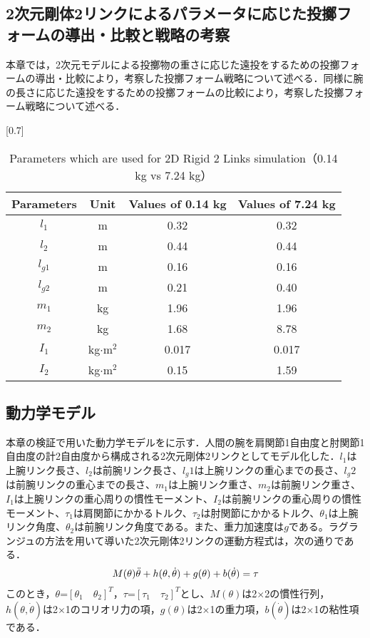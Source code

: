 \begin{small}
\section{2次元剛体2リンクによるパラメータに応じた投擲フォームの導出・比較と戦略の考察}
本章では，2次元モデルによる投擲物の重さに応じた遠投をするための投擲フォームの導出・比較により，考察した投擲フォーム戦略について述べる．同様に腕の長さに応じた遠投をするための投擲フォームの比較により，考察した投擲フォーム戦略について述べる．
\begin{table}[t]
  \begin{center}
    \caption{Parameters which are used for 2D Rigid 2 Links simulation（0.14 kg vs 7.24 kg）}
    \scalebox{0.7}[0.7]{
    \begin{tabular}{c|c|c|c}
      \hline
      Parameters & Unit & Values of 0.14 kg & Values of 7.24 kg \\
      \hline
      $l_{1}$ & m & 0.32 & 0.32\\
      $l_{2}$ & m & 0.44 & 0.44\\
      $l_{g1}$ & m & 0.16 & 0.16 \\
      $l_{g2}$ & m & 0.21 & 0.40 \\
      $m_{1}$ & kg & 1.96 & 1.96\\
      $m_{2}$ & kg & 1.68 & 8.78 \\
      $I_{1}$ & kg$\cdot$$\mathrm{m}^2$ & 0.017 & 0.017 \\
      $I_{2}$ & kg$\cdot$$\mathrm{m}^2$ & 0.15 & 1.59 \\
      \hline
    \end{tabular}
    }
  \end{center}
\end{table}
\subsection{動力学モデル}
本章の検証で用いた動力学モデルをに示す．人間の腕を肩関節1自由度と肘関節1自由度の計2自由度から構成される2次元剛体2リンクとしてモデル化した．$l_{1}$は上腕リンク長さ、$l_{2}$は前腕リンク長さ、$l_g{1}$は上腕リンクの重心までの長さ、$l_g{2}$は前腕リンクの重心までの長さ、$m_{1}$は上腕リンク重さ、$m_{2}$は前腕リンク重さ、$I_{1}$は上腕リンクの重心周りの慣性モーメント、$I_{2}$は前腕リンクの重心周りの慣性モーメント、$\tau_{1}$は肩関節にかかるトルク、$\tau_{2}$は肘関節にかかるトルク、$\theta_{1}$は上腕リンク角度、$\theta_{2}$は前腕リンク角度である。また、重力加速度は$g$である。ラグランジュの方法を用いて導いた2次元剛体2リンクの運動方程式は，次の通りである．
\begin{eqnarray}
  \equlabel{5}
  M(\theta)\ddot{\theta} + h(\theta, \dot{\theta}) + g(\theta) + b(\dot{\theta}) = \tau
\end{eqnarray}
このとき，$\theta$=${[\theta_{1} \quad \theta_{2}]}^T$，$\tau$=${[\tau_{1} \quad \tau_{2}]}^T$とし、$M(\theta)$は2$\times$2の慣性行列，$h(\theta, \dot{\theta})$は2$\times$1のコリオリ力の項，$g(\theta)$は2$\times$1の重力項，$b(\dot{\theta})$は2$\times$1の粘性項である．

\end{small}
